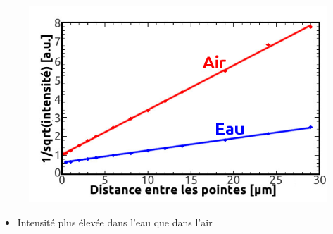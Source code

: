 \documentclass[9pt,a9paper,handout]{beamer}
\begin{document}
\begin{frame}
\begin{figure}[c]
            ~\\
            \includegraphics[height=0.195\textwidth]{Images/Scans/NuesDistanceIntensite}
        \end{figure}
        \vspace*{-15mm}
        \begin{itemize}
            \item Intensité plus élevée dans l'eau que dans l'air
        \end{itemize}
    \end{frame}
\end{document}
